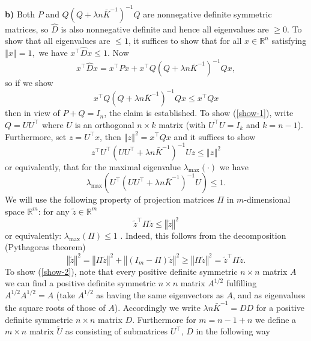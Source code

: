 \documentclass[11pt,twoside]{article}%
\theoremstyle{change}
\newenvironment{quote-env}{\begin{quote}\sffamily }{\end{quote}}
\newenvironment{mycomments-env}[1][Mycomments]{\textbf{#1.} \begin{quote-env} }{ \end{quote-env}  \ \rule{0.5em}{0.5em}}
\begin{document}
\begin{mycomments}
\begin{mycomments-env}
\textbf{b)} Both $P$ and $Q\left(  Q+\lambda n\bar{K}^{-1}\right)  ^{-1}Q$ are
nonnegative definite symmetric matrices, so $\hat{D}$ is also nonnegative
definite and hence all eigenvalues are $\geq0$. To show that all eigenvalues
are $\leq1$, it suffices to show that for all $x\in\mathbb{R}^{n}$ satisfying
$\left\Vert x\right\Vert =1,$ we have $x^{\top}\hat{D}x\leq1$. Now
\[
x^{\top}\hat{D}x=x^{\top}Px+x^{\top}Q\left(  Q+\lambda n\bar{K}^{-1}\right)
^{-1}Qx,
\]
so if we show
\begin{equation}
x^{\top}Q\left(  Q+\lambda n\bar{K}^{-1}\right)  ^{-1}Qx\leq x^{\top
}Qx\label{show-1}%
\end{equation}
then in view of $P+Q=I_{n}$, the claim is established. To show (\ref{show-1}),
write $Q=UU^{\top}$ where $U$ is an orthogonal $n\times k$ matrix (with
$U^{\top}U=I_{k}$ and $k=n-1$). Furthermore, set $z=U^{\top}x$, then
$\left\Vert z\right\Vert ^{2}=x^{\top}Qx$ and it suffices to show
\begin{equation}
z^{\top}U^{\top}\left(  UU^{\top}+\lambda n\bar{K}^{-1}\right)  ^{-1}%
Uz\leq\left\Vert z\right\Vert ^{2}\label{show-2}%
\end{equation}
or equivalently, that for the maximal eigenvalue $\lambda_{\max}(\cdot)$ we
have
\[
\lambda_{\max}\left(  U^{\top}\left(  UU^{\top}+\lambda n\bar{K}^{-1}\right)
^{-1}U\right)  \leq1.
\]
We will use the following property of projection matrices $\Pi$ in
$m$-dimensional space $\mathbb{R}^{m}$: for any $\tilde{z}\in\mathbb{R}^{m}$
\begin{equation}
\tilde{z}^{\top}\Pi\tilde{z}\leq\left\Vert \tilde{z}\right\Vert ^{2}%
\label{proj-propert}%
\end{equation}
or equivalently: $\lambda_{\max}(\Pi)\leq1$ . Indeed, this follows from the
decomposition (Pythagoras theorem)
\[
\left\Vert \tilde{z}\right\Vert ^{2}=\left\Vert \Pi\tilde{z}\right\Vert
^{2}+\left\Vert \left(  I_{m}-\Pi\right)  \tilde{z}\right\Vert ^{2}%
\geq\left\Vert \Pi\tilde{z}\right\Vert ^{2}=\tilde{z}^{\top}\Pi\tilde{z}.
\]
To show (\ref{show-2}), note that every positive definite symmetric $n\times
n$ matrix $A$ we can find a positive definite symmetric $n\times n$ matrix
$A^{1/2}$ fulfilling $A^{1/2}A^{1/2}=A$ (take $A^{1/2}$ as having the same
eigenvectors as $A$, and as eigenvalues the square roots of those of $A$).
Accordingly we write $\lambda n\bar{K}^{-1}=DD$ for a positive definite
symmetric $n\times n$ matrix $D$. Furthermore for $m=n-1+n$ we define a
$m\times n$ matrix $\tilde{U}$ as consisting of submatrices $U^{\top}$, $D$ in
the following way

\end{mycomments-env}
\end{mycomments}
\end{document}
